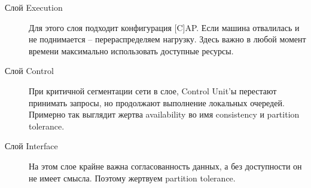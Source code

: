 \begin{description}
  \item[Слой Execution] Для этого слоя подходит конфигурация [C]AP. Если машина отвалилась и не поднимается -- перераспределяем нагрузку. Здесь важно в любой момент времени максимально использовать доступные ресурсы.
  \item[Слой Control] При критичной сегментации сети в слое, Control Unit'ы перестают принимать запросы, но продолжают выполнение локальных очередей. Примерно так выглядит жертва availability во имя consistency и partition tolerance.
  \item[Слой Interface] На этом слое крайне важна согласованность данных, а без доступности он не имеет смысла. Поэтому жертвуем partition tolerance.

\end{description}
